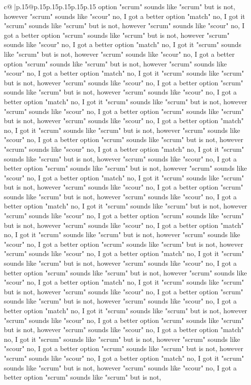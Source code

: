 \documentclass{article}
\begin{document}
{\begin{supertabular}{c@{$\;$}|p{.15\linewidth}@{}p{.15\linewidth}p{.15\linewidth}p{.15\linewidth}p{.15\linewidth}p{.15\linewidth}}
{{{option "scrum" sounds like "scrum" but is not, however "scrum" sounds like "scour" no, I got a better option "match" no, I got it "scrum" sounds like "scrum" but is not, however "scrum" sounds like "scour" no, I got a better option "scrum" sounds like "scrum" but is not, however "scrum" sounds like "scour" no, I got a better option "match" no, I got it "scrum" sounds like "scrum" but is not, however "scrum" sounds like "scour" no, I got a better option "scrum" sounds like "scrum" but is not, however "scrum" sounds like "scour" no, I got a better option "match" no, I got it "scrum" sounds like "scrum" but is not, however "scrum" sounds like "scour" no, I got a better option "scrum" sounds like "scrum" but is not, however "scrum" sounds like "scour" no, I got a better option "match" no, I got it "scrum" sounds like "scrum" but is not, however "scrum" sounds like "scour" no, I got a better option "scrum" sounds like "scrum" but is not, however "scrum" sounds like "scour" no, I got a better option "match" no, I got it "scrum" sounds like "scrum" but is not, however "scrum" sounds like "scour" no, I got a better option "scrum" sounds like "scrum" but is not, however "scrum" sounds like "scour" no, I got a better option "match" no, I got it "scrum" sounds like "scrum" but is not, however "scrum" sounds like "scour" no, I got a better option "scrum" sounds like "scrum" but is not, however "scrum" sounds like "scour" no, I got a better option "match" no, I got it "scrum" sounds like "scrum" but is not, however "scrum" sounds like "scour" no, I got a better option "scrum" sounds like "scrum" but is not, however "scrum" sounds like "scour" no, I got a better option "match" no, I got it "scrum" sounds like "scrum" but is not, however "scrum" sounds like "scour" no, I got a better option "scrum" sounds like "scrum" but is not, however "scrum" sounds like "scour" no, I got a better option "match" no, I got it "scrum" sounds like "scrum" but is not, however "scrum" sounds like "scour" no, I got a better option "scrum" sounds like "scrum" but is not, however "scrum" sounds like "scour" no, I got a better option "match" no, I got it "scrum" sounds like "scrum" but is not, however "scrum" sounds like "scour" no, I got a better option "scrum" sounds like "scrum" but is not, however "scrum" sounds like "scour" no, I got a better option "match" no, I got it "scrum" sounds like "scrum" but is not, however "scrum" sounds like "scour" no, I got a better option "scrum" sounds like "scrum" but is not, however "scrum" sounds like "scour" no, I got a better option "match" no, I got it "scrum" sounds like "scrum" but is not, however "scrum" sounds like "scour" no, I got a better option "scrum" sounds like "scrum" but is not, however "scrum" sounds like "scour" no, I got a better option "match" no, I got it "scrum" sounds like "scrum" but is not, however "scrum" sounds like "scour" no, I got a better option "scrum" sounds like "scrum" but is not, however "scrum" sounds like "scour" no, I got a better option "match" no, I got it "scrum" sounds like "scrum" but is not, however "scrum" sounds like "scour" no, I got a better option "scrum" sounds like "scrum" but is not, }}}
\end{supertabular}}
\end{document}
